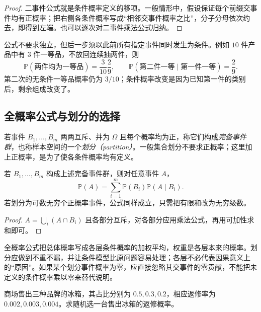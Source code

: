 \begin{proof}
二事件公式就是条件概率定义的移项。一般情形中，假设保证每个前缀交事件均有正概率；把右侧各条件概率写成“相邻交事件概率之比”，分子分母依次约去，即得到左端。也可以逐次对二事件乘法公式归纳。
\end{proof}

公式不要求独立，但后一步须以此前所有指定事件同时发生为条件。例如 $10$ 件产品中有 $3$ 件一等品，不放回连续抽两件，则
\[
 \mathbb P(\text{两件均为一等品})=\frac3{10}\frac2{9},\qquad
 \mathbb P(\text{第二件一等}\mid\text{第一件一等})=\frac2{9}.
\]
第二次的无条件一等品概率仍为 $3/10$；条件概率改变是因为已知第一件的类别后，剩余组成改变了。

\subsection{全概率公式与划分的选择}
\label{subsec:study-total-probability}

\begin{definition}
\label{def:study-partition}
若事件 $B_1,\ldots,B_m$ 两两互斥、并为 $\Omega$ 且每个概率均为正，称它们构成\emph{完备事件群}，也称样本空间的一个\emph{划分（partition）}。一般集合划分不要求正概率；这里加上正概率，是为了使各条件概率均有定义。
\end{definition}

\begin{theorem}[全概率公式]
\label{thm:study-total-probability}
若 $B_1,\ldots,B_m$ 构成上述完备事件群，则对任意事件 $A$，
\begin{equation}
 \mathbb P(A)=\sum_{i=1}^{m}\mathbb P(B_i)\mathbb P(A\mid B_i).
 \label{eq:study-total-probability}
\end{equation}
若划分为可数无穷个正概率事件，公式同样成立，只需把有限和改为无穷级数。
\end{theorem}

\begin{proof}
$A=\bigcup_i(A\cap B_i)$ 且各部分互斥，对各部分应用乘法公式，再用可加性求和即可。
\end{proof}

全概率公式把总体概率写成各层条件概率的加权平均，权重是各层本来的概率。划分应做到不重不漏，并让条件模型比原问题容易处理；各层不必代表因果意义上的“原因”。如果某个划分事件概率为零，应直接忽略其交事件的零贡献，不能把未定义的条件概率乘以零来替代说明。

\begin{example}
\label{ex:study-refrigerator-total}
商场售出三种品牌的冰箱，其占比分别为 $0.5,0.3,0.2$，相应返修率为 $0.002,0.003,0.004$。求随机选一台售出冰箱的返修概率。
\end{example}


